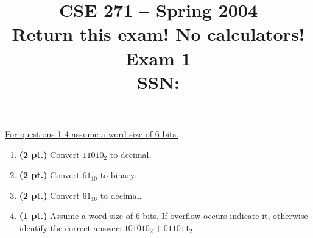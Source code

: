 \documentclass{article}
\begin{document}
\newcommand{\SOPmin}{${\rm SOP}_{\rm min} \ $}
\newcommand{\POSmin}{${\rm POS}_{\rm min} \ $}
\newcommand{\bs}{\backslash}


\title{
\Huge{CSE 271 -- Spring 2004}\\
\normalsize{Return this exam!  No calculators!}\\
\normalsize{Exam 1}\\
SSN:}
\date{}

\maketitle{}

\underline{For questions 1-4 assume a word size of 6 bits.}

\begin{enumerate}
\item {\bf (2 pt.)} Convert $11010_2$ to decimal.

\item {\bf (2 pt.)} Convert $61_{10}$ to binary.

\item {\bf (2 pt.)} Convert $61_{16}$ to decimal.

\pagebreak
\item {\bf (1 pt.)} Assume a word size of 6-bits.  If overflow occurs 
indicate it, otherwise identify the correct answer: $101010_2 + 011011_2$


\end{enumerate}
\end{document}
